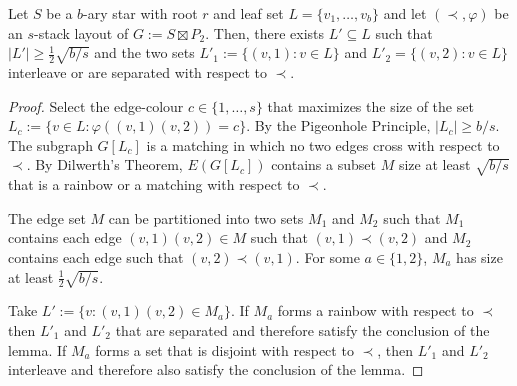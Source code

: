 \documentclass[kpfonts]{patmorin}
\begin{document}
\begin{lem}
  Let $S$ be a $b$-ary star with root $r$ and leaf set $L=\{v_1,\ldots,v_b\}$ and let $(\prec,\varphi)$ be an $s$-stack layout of $G:=S\boxtimes P_2$.  Then, there exists $L'\subseteq L$ such that $|L'|\ge \tfrac{1}{2}\sqrt{b/s}$ and the two sets $L'_1:=\{(v,1):v\in L\}$ and $L'_2=\{(v,2):v\in L\}$ interleave or are separated with respect to $\prec$.  
\end{lem}

\begin{proof}
  Select the edge-colour $c\in\{1,\ldots,s\}$ that maximizes the size of the set $L_c:=\{ v\in L: \varphi((v,1)(v,2))=c\}$.  By the Pigeonhole Principle, $|L_c|\ge b/s$.  The subgraph $G[L_c]$ is a matching in which no two edges cross with respect to $\prec$.  By Dilwerth's Theorem, $E(G[L_c])$ contains a subset $M$ size at least $\sqrt{b/s}$ that is a rainbow or a matching with respect to $\prec$.

  The edge set $M$ can be partitioned into two sets $M_1$ and $M_2$ such that $M_1$ contains each edge $(v,1)(v,2)\in M$ such that $(v,1)\prec (v,2)$ and $M_2$ contains each edge such that $(v,2)\prec (v,1)$.  For some $a\in\{1,2\}$, $M_a$ has size at least $\tfrac{1}{2}\sqrt{b/s}$. 
    
  Take $L':=\{v: (v,1)(v,2)\in M_a\}$.  If $M_a$ forms a rainbow with respect to $\prec$ then $L'_1$ and $L'_2$ that are separated and therefore satisfy the conclusion of the lemma.  If $M_a$ forms a set that is disjoint with respect to $\prec$, then $L'_1$ and $L'_2$ interleave and therefore also satisfy the conclusion of the lemma.
\end{proof}
\end{document}
